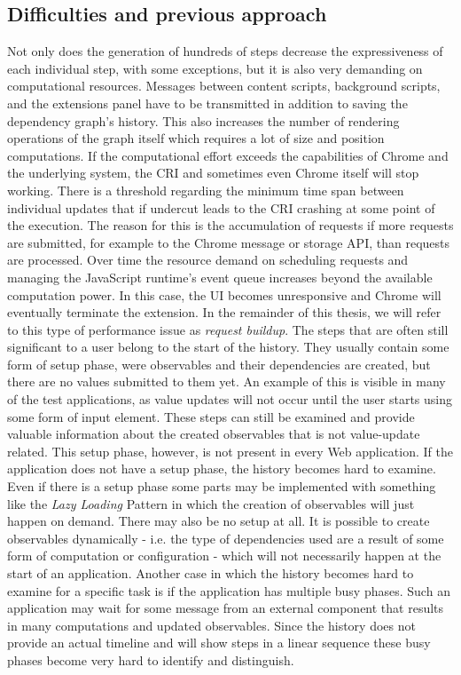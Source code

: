 \subsection{Difficulties and previous approach}
Not only does the generation of hundreds of steps decrease the expressiveness of each individual step, with some exceptions, but it is also very demanding on computational resources. Messages between content scripts, background scripts, and the extensions panel have to be transmitted in addition to saving the dependency graph's history. This also increases the number of rendering operations of the graph itself which requires a lot of size and position computations. If the computational effort exceeds the capabilities of Chrome and the underlying system, the CRI and sometimes even Chrome itself will stop working. There is a threshold regarding the minimum time span between individual updates that if undercut leads to the CRI crashing at some point of the execution. The reason for this is the accumulation of requests if more requests are submitted, for example to the Chrome message or storage API, than requests are processed. Over time the resource demand on scheduling requests and managing the JavaScript runtime's event queue increases beyond the available computation power. In this case, the UI becomes unresponsive and Chrome will eventually terminate the extension. In the remainder of this thesis, we will refer to this type of performance issue as \emph{request buildup}.
The steps that are often still significant to a user belong to the start of the history. They usually contain some form of setup phase, were observables and their dependencies are created, but there are no values submitted to them yet. An example of this is visible in many of the test applications, as value updates will not occur until the user starts using some form of input element. These steps can still be examined and provide valuable information about the created observables that is not value-update related. This setup phase, however, is not present in every Web application. If the application does not have a setup phase, the history becomes hard to examine. Even if there is a setup phase some parts may be implemented with something like the \emph{Lazy Loading} Pattern \cite{Lazy} in which the creation of observables will just happen on demand. There may also be no setup at all. It is possible to create observables dynamically - i.e. the type of dependencies used are a result of some form of computation or configuration - which will not necessarily happen at the start of an application. Another case in which the history becomes hard to examine for a specific task is if the application has multiple busy phases. Such an application may wait for some message from an external component that results in many computations and updated observables. Since the history does not provide an actual timeline and will show steps in a linear sequence these busy phases become very hard to identify and distinguish. 
